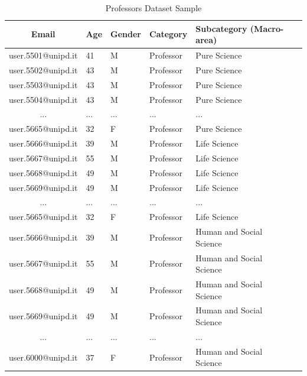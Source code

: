\documentclass[a4paper]{article}
\begin{document}
\newpage

\begingroup
\renewcommand{\arraystretch}{1.25}
\begin{table}[ht]
\begin{center}
    \begin{tabular}{ | c | l | l | l | l | l | }
    \hline
    \textbf{Email} & \textbf{Age} & \textbf{Gender} & \textbf{Category} & \textbf{Subcategory (Macro-area)} \\
    \hline
    user.5501@unipd.it & 41 & M & Professor & Pure Science \\
    \hline
    user.5502@unipd.it & 43 & M & Professor & Pure Science \\
    \hline
    user.5503@unipd.it & 43 & M & Professor & Pure Science \\
    \hline
    user.5504@unipd.it & 43 & M & Professor & Pure Science \\
    \hline
    ... & ... & ... & ... & ... \\
    \hline
    user.5665@unipd.it & 32 & F & Professor & Pure Science \\
    \hline
    user.5666@unipd.it & 39 & M & Professor & Life Science \\
    \hline
    user.5667@unipd.it & 55 & M & Professor & Life Science \\
    \hline
    user.5668@unipd.it & 49 & M & Professor & Life Science \\
    \hline
    user.5669@unipd.it & 49 & M & Professor & Life Science \\
    \hline
    ... & ... & ... & ... & ... \\
    \hline
    user.5665@unipd.it & 32 & F & Professor & Life Science \\
    \hline
    user.5666@unipd.it & 39 & M & Professor & Human and Social Science \\
    \hline
    user.5667@unipd.it & 55 & M & Professor & Human and Social Science \\
    \hline
    user.5668@unipd.it & 49 & M & Professor & Human and Social Science \\
    \hline
    user.5669@unipd.it & 49 & M & Professor & Human and Social Science \\
    \hline
    ... & ... & ... & ... & ... \\
    \hline
    user.6000@unipd.it & 37 & F & Professor & Human and Social Science \\
    \hline
    \end{tabular}
\end{center}
\caption{Professors Dataset Sample}
\label{t-doc-sample}
\end{table}
\end{document}
